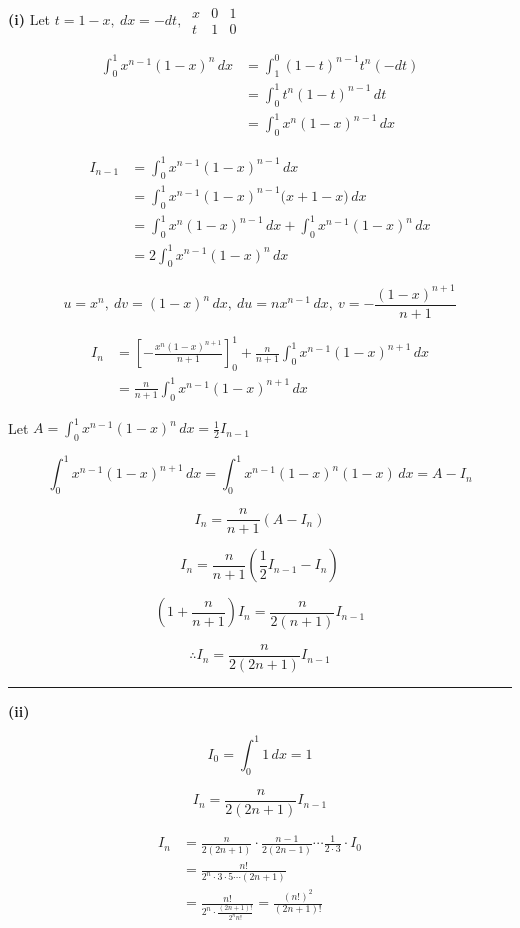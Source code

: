 \documentclass[12pt]{article}
\begin{document}
\newcommand{\ds}{\displaystyle}

\textbf{(i)} Let $\ds t=1-x, \ dx=-dt,\ 
\begin{array}{c|cc}
x&0&1\\
\hline
t&1&0
\end{array}
$


\begin{align*}
\int_0^1 x^{n-1}(1-x)^n\,dx
&=\int_1^0 (1-t)^{n-1}t^n(-dt)\\
&=\int_0^1 t^n(1-t)^{n-1}\,dt\\
&=\int_0^1 x^n(1-x)^{n-1}\,dx
\end{align*}

\begin{align*}
I_{n-1}
&=\int_0^1 x^{n-1}(1-x)^{n-1}\,dx\\
&=\int_0^1 x^{n-1}(1-x)^{n-1}\bigl(x+1-x\bigr)\,dx\\
&=\int_0^1 x^n(1-x)^{n-1}\,dx+\int_0^1 x^{n-1}(1-x)^n\,dx\\
&=2\int_0^1 x^{n-1}(1-x)^n\,dx
\end{align*}


$$u=x^n,\  dv=(1-x)^n\,dx,\ du=nx^{n-1}\,dx,\  v=-\frac{(1-x)^{n+1}}{n+1}$$

\begin{align*}
I_n
&=\left[-\frac{x^n(1-x)^{n+1}}{n+1}\right]_0^1+\frac{n}{n+1}\int_0^1 x^{n-1}(1-x)^{n+1}\,dx\\
&=\frac{n}{n+1}\int_0^1 x^{n-1}(1-x)^{n+1}\,dx
\end{align*}

Let $\ds A=\int_0^1 x^{n-1}(1-x)^n\,dx=\frac12 I_{n-1}$

$$\int_0^1 x^{n-1}(1-x)^{n+1}\,dx
=\int_0^1 x^{n-1}(1-x)^n(1-x)\,dx
=A-I_n$$

$$I_n=\frac{n}{n+1}(A-I_n)$$

$$I_n=\frac{n}{n+1}\left(\frac12 I_{n-1}-I_n\right)$$

$$\left(1+\frac{n}{n+1}\right)I_n=\frac{n}{2(n+1)}I_{n-1}$$

$$\therefore I_n=\frac{n}{2(2n+1)}I_{n-1}$$

\bigskip\hrule\bigskip

\textbf{(ii)}

$$I_0=\int_0^1 1\,dx=1$$

$$I_n=\frac{n}{2(2n+1)}I_{n-1}$$

\begin{align*}
I_n
&=\frac{n}{2(2n+1)}\cdot\frac{n-1}{2(2n-1)}\cdots\frac{1}{2\cdot3}\cdot I_0\\
&=\frac{n!}{2^n\cdot3\cdot5\cdots(2n+1)}\\
&=\frac{n!}{2^n\cdot\frac{(2n+1)!}{2^n n!}}=\frac{(n!)^2}{(2n+1)!}
\end{align*}
\end{document}
